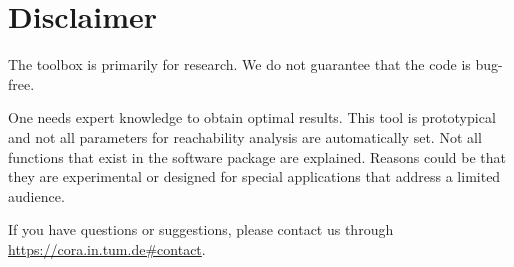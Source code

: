 
\section{Disclaimer}

The toolbox is primarily for research. We do not guarantee that the code is bug-free.

One needs expert knowledge to obtain optimal results. This tool is prototypical and not all parameters for reachability analysis are automatically set. Not all functions that exist in the software package are explained. Reasons could be that they are experimental or designed for special applications that address a limited audience.

If you have questions or suggestions, please contact us through \url{https://cora.in.tum.de#contact}.
